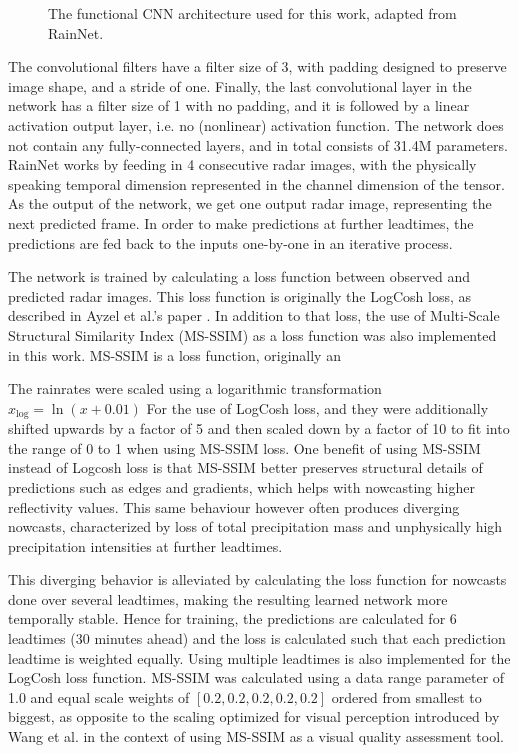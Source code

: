 \begin{figure}[h]
	\label{fig:rainnet}
	\caption{The functional CNN architecture used for this work, adapted from RainNet.}
\end{figure}

The convolutional filters have a filter size of 3, with padding designed to preserve image shape, and a stride of one. Finally, the last convolutional layer in the network has a filter size of 1 with no padding, and it is followed by a linear activation output layer, i.e. no (nonlinear) activation function. The network does not contain any fully-connected layers, and in total consists of 31.4M parameters. RainNet works by feeding in 4 consecutive radar images, with the physically speaking temporal dimension represented in the channel dimension of the tensor. As the output of the network, we get one output radar image, representing the next predicted frame. In order to make predictions at further leadtimes, the predictions are fed back to the inputs one-by-one in an iterative process. 

The network is trained by calculating a loss function between observed and predicted radar images. This loss function is originally the LogCosh loss, as described in Ayzel et al.'s paper \cite{ayzel_rainnet_nodate}. In addition to that loss, the use of Multi-Scale Structural Similarity Index (MS-SSIM) \cite{wang_multiscale_2003} as a loss function was also implemented in this work. MS-SSIM is a loss function, originally an 

The rainrates were scaled using a logarithmic transformation $x_{\log} = \ln(x + 0.01)$ For the use of LogCosh loss, and they were additionally shifted upwards by a factor of 5 and then scaled down by a factor of 10 to fit into the range of 0 to 1 when using MS-SSIM loss. One benefit of using MS-SSIM instead of Logcosh loss is that MS-SSIM better preserves structural details of predictions such as edges and gradients, which helps with nowcasting higher reflectivity values. This same behaviour however often produces diverging nowcasts, characterized by loss of total precipitation mass and unphysically high precipitation intensities at further leadtimes. 

This diverging behavior is alleviated by calculating the loss function for nowcasts done over several leadtimes, making the resulting learned network more temporally stable. Hence for training, the predictions are calculated for 6 leadtimes (30 minutes ahead) and the loss is calculated such that each prediction leadtime is weighted equally. Using multiple leadtimes is also implemented for the LogCosh loss function. MS-SSIM was calculated using a data range parameter of 1.0 and equal scale weights of $[0.2, 0.2, 0.2, 0.2, 0.2]$ ordered from smallest to biggest, as opposite to the scaling optimized for visual perception introduced by Wang et al. \cite{wang_multiscale_2003} in the context of using MS-SSIM as a visual quality assessment tool. 


